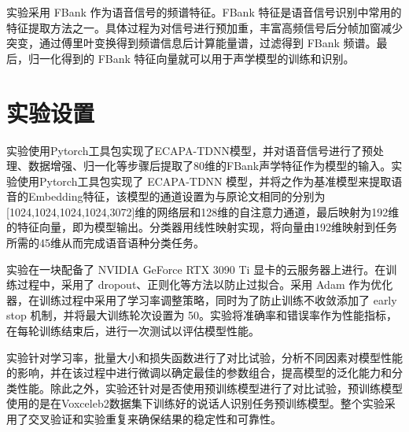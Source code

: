 实验采用 FBank 作为语音信号的频谱特征。FBank 特征是语音信号识别中常用的特征提取方法之一。具体过程为对信号进行预加重，丰富高频信号后分帧加窗减少突变，通过傅里叶变换得到频谱信息后计算能量谱，过滤得到 FBank 频谱。最后，归一化得到的 FBank 特征向量就可以用于声学模型的训练和识别。


\section{实验设置}

实验使用Pytorch工具包实现了ECAPA-TDNN模型，并对语音信号进行了预处理、数据增强、归一化等步骤后提取了80维的FBank声学特征作为模型的输入。实验使用Pytorch工具包实现了 ECAPA-TDNN 模型，并将之作为基准模型来提取语音的Embedding特征，该模型的通道设置为与原论文相同的分别为[1024,1024,1024,1024,3072]维的网络层和128维的自注意力通道，最后映射为192维的特征向量，即为模型输出。分类器用线性映射实现，将向量由192维映射到任务所需的45维从而完成语音语种分类任务。

实验在一块配备了 NVIDIA GeForce RTX 3090 Ti 显卡的云服务器上进行。在训练过程中，采用了 dropout、正则化等方法以防止过拟合。采用 Adam 作为优化器，在训练过程中采用了学习率调整策略，同时为了防止训练不收敛添加了 early stop 机制，并将最大训练轮次设置为 50。实验将准确率和错误率作为性能指标，在每轮训练结束后，进行一次测试以评估模型性能。

实验针对学习率，批量大小和损失函数进行了对比试验，分析不同因素对模型性能的影响，并在该过程中进行微调以确定最佳的参数组合，提高模型的泛化能力和分类性能。除此之外，实验还针对是否使用预训练模型进行了对比试验，预训练模型使用的是在Voxceleb2数据集下训练好的说话人识别任务预训练模型。整个实验采用了交叉验证和实验重复来确保结果的稳定性和可靠性。


